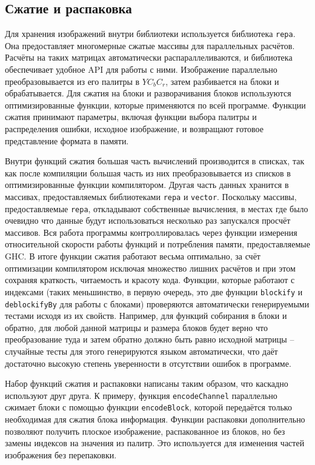 \documentclass[a4paper,12pt]{article}
\numberwithin{equation}{section}
\begin{document}
\subsection{Сжатие и распаковка}

Для хранения изображений внутри библиотеки используется библиотека
\texttt{repa}. Она предоставляет многомерные сжатые массивы для параллельных
расчётов. Расчёты на таких матрицах автоматически распараллеливаются, и
библиотека обеспечивает удобное API для работы с ними. Изображение параллельно
преобразовывается из его палитры в $YC_bC_r$, затем разбивается на блоки и
обрабатывается. Для сжатия на блоки и разворачивания блоков используются
оптимизированные функции, которые применяются по всей программе. Функции сжатия
принимают параметры, включая функции выбора палитры и распределения ошибки,
исходное изображение, и возвращают готовое представление формата в памяти.

Внутри функций сжатия большая часть вычислений производится в списках, так как
после компиляции большая часть из них преобразовывается из списков в
оптимизированные функции компилятором. Другая часть данных хранится в массивах,
предоставляемых библиотеками \texttt{repa} и \texttt{vector}. Поскольку массивы,
предоставляемые \texttt{repa}, откладывают собственные вычисления, в местах где
было очевидно что данные будут использоваться несколько раз запускался просчёт
массивов. Вся работа программы контроллировалась через функции измерения
относительной скорости работы функций и потребления памяти, предоставляемые
GHC. В итоге функции сжатия работают весьма оптимально, за счёт оптимизации
компилятором исключая множество лишних расчётов и при этом сохраняя краткость,
читаемость и красоту кода. Функции, которые работают с индексами (таких
меньшинство, в первую очередь, это две функции \texttt{blockify} и
\texttt{deblockifyBy} для работы с блоками) проверяются автоматически
генерируемыми тестами исходя из их свойств. Например, для функций собирания в
блоки и обратно, для любой данной матрицы и размера блоков будет верно что
преобразование туда и затем обратно должно быть равно исходной матрицы --
случайные тесты для этого генерируются языком автоматически, что даёт достаточно
высокую степень уверенности в отсутствии ошибок в программе.

Набор функций сжатия и распаковки написаны таким образом, что каскадно
используют друг друга. К примеру, функция \texttt{encodeChannel} параллельно
сжимает блоки с помощью функции \texttt{encodeBlock}, которой передаётся только
необходимая для сжатия блока информация. Функции распаковки дополнительно
позволяют получить плоское изображение, распакованное из блоков, но без замены
индексов на значения из палитр. Это используется для изменения частей
изображения без перепаковки.
\end{document}
